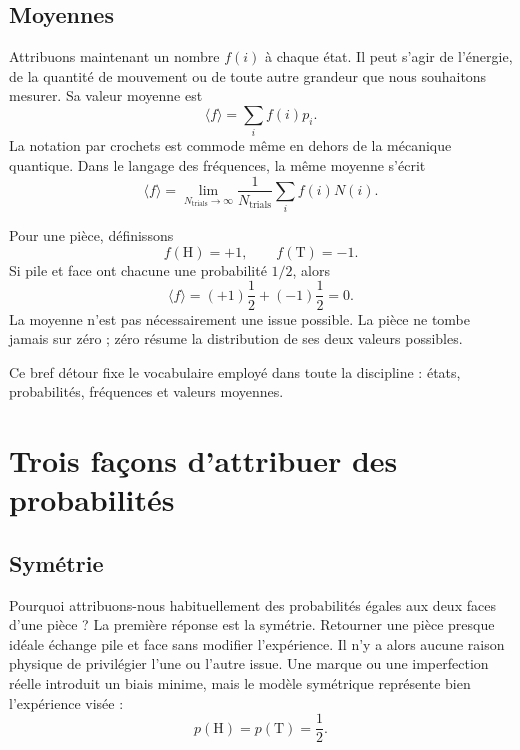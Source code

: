 \subsection{Moyennes}

Attribuons maintenant un nombre \(f(i)\) à chaque état. Il peut s’agir de l’énergie, de la quantité de mouvement ou de toute autre grandeur que nous souhaitons mesurer. Sa valeur moyenne est
\begin{equation}
 \langle f\rangle=\sum_i f(i)p_i.
 \label{eq:sm1-expectation}
\end{equation}
La notation par crochets est commode même en dehors de la mécanique quantique. Dans le langage des fréquences, la même moyenne s’écrit
\begin{equation}
 \langle f\rangle
 =
 \lim_{N_{\mathrm{trials}}\to\infty}
 \frac{1}{N_{\mathrm{trials}}}
 \sum_i f(i)N(i).
 \label{eq:sm1-frequency-average}
\end{equation}

Pour une pièce, définissons
\begin{equation}
 f(\mathrm{H})=+1,
 \qquad
 f(\mathrm{T})=-1.
\end{equation}
Si pile et face ont chacune une probabilité \(1/2\), alors
\begin{equation}
 \langle f\rangle
 =(+1)\frac12+(-1)\frac12=0.
\end{equation}
La moyenne n’est pas nécessairement une issue possible. La pièce ne tombe jamais sur zéro ; zéro résume la distribution de ses deux valeurs possibles.

Ce bref détour fixe le vocabulaire employé dans toute la discipline : états, probabilités, fréquences et valeurs moyennes.

\section{Trois façons d’attribuer des probabilités}

\subsection{Symétrie}

Pourquoi attribuons-nous habituellement des probabilités égales aux deux faces d’une pièce ? La première réponse est la symétrie. Retourner une pièce presque idéale échange pile et face sans modifier l’expérience. Il n’y a alors aucune raison physique de privilégier l’une ou l’autre issue. Une marque ou une imperfection réelle introduit un biais minime, mais le modèle symétrique représente bien l’expérience visée :
\begin{equation}
 p(\mathrm{H})=p(\mathrm{T})=\frac12.
\end{equation}


